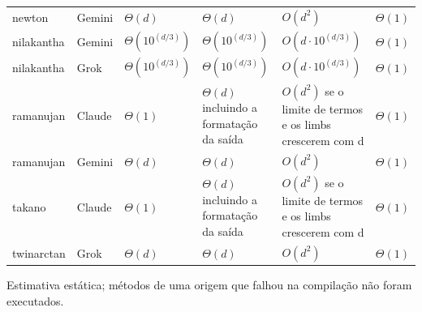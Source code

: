 \begin{longtable}{p{2.0cm}p{1.8cm}p{2.2cm}p{2.6cm}p{3.0cm}p{1.5cm}}
newton & Gemini & $\Theta(d)$ & $\Theta(d)$ & $O(d^2)$ & $\Theta(1)$\\
nilakantha & Gemini & $\Theta(10^(d/3))$ & $\Theta(10^(d/3))$ & $O(d \cdot  10^(d/3))$ & $\Theta(1)$\\
nilakantha & Grok & $\Theta(10^(d/3))$ & $\Theta(10^(d/3))$ & $O(d \cdot  10^(d/3))$ & $\Theta(1)$\\
ramanujan & Claude & $\Theta(1)$ & $\Theta(d)$ incluindo a formatação da saída & $O(d^2)$ se o limite de termos e os limbs crescerem com d & $\Theta(1)$\\
ramanujan & Gemini & $\Theta(d)$ & $\Theta(d)$ & $O(d^2)$ & $\Theta(1)$\\
takano & Claude & $\Theta(1)$ & $\Theta(d)$ incluindo a formatação da saída & $O(d^2)$ se o limite de termos e os limbs crescerem com d & $\Theta(1)$\\
twinarctan & Grok & $\Theta(d)$ & $\Theta(d)$ & $O(d^2)$ & $\Theta(1)$\\
\bottomrule
\end{longtable}
\noindent\footnotesize Estimativa estática; métodos de uma origem que falhou na compilação não foram executados.\normalsize
